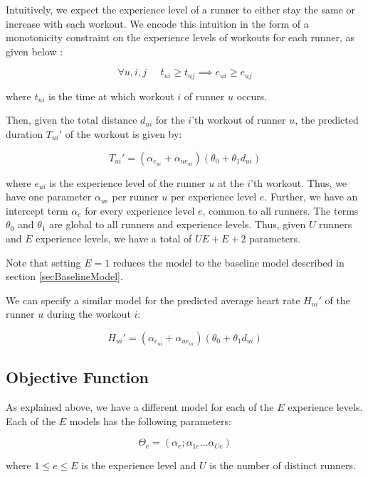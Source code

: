 \documentclass{acm_proc_article-sp}
\begin{document}
Intuitively, we expect the experience level of a runner to either stay the same or increase with each workout. We encode this intuition in the form of a monotonicity constraint on the experience levels of workouts for each runner, as given below \cite{www13}:

$$\forall u,i,j \;\;\;\;\; t_{ui} \geq t_{uj} \implies e_{ui} \geq e_{uj}$$

where $t_{ui}$ is the time at which workout $i$ of runner $u$ occurs.

Then, given the total distance $d_{ui}$ for the $i$'th workout of runner $u$, the predicted duration $T_{ui}'$ of the workout is given by:

\begin{equation}
\label{eqnModelDuration}
T_{ui}' = (\alpha_{e_{ui}} + \alpha_{ue_{ui}})(\theta_0 + \theta_1 d_{ui})
\end{equation}


where $e_{ui}$ is the experience level of the runner $u$ at the $i$'th workout. Thus, we have one parameter $\alpha_{ue}$ per runner $u$ per experience level $e$. Further, we have an intercept term $\alpha_e$ for every experience level $e$, common to all runners. The terms $\theta_0$ and $\theta_1$ are global to all runners and experience levels. Thus, given $U$ runners and $E$ experience levels, we have a total of $UE + E + 2$ parameters.

Note that setting $E = 1$ reduces the model to the baseline model described in section \ref{secBaselineModel}.

We can specify a similar model for the predicted average heart rate $H_{ui}'$ of the runner $u$ during the workout $i$:

\begin{equation}
\label{eqnModelAvgHr}
H_{ui}' = (\alpha_{e_{ui}} + \alpha_{ue_{ui}})(\theta_0 + \theta_1 d_{ui})
\end{equation}

\subsection{Objective Function}
As explained above, we have a different model for each of the $E$ experience levels. Each of the $E$ models has the following parameters:

$$\Theta_e = (\alpha_e; \alpha_{1e}...\alpha_{Ue})$$

where $1 \leq e \leq E$ is the experience level and $U$ is the number of distinct runners.
\end{document}
